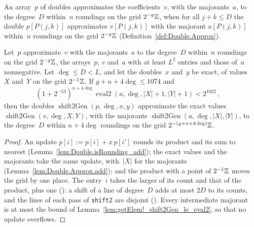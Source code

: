 \begin{definition}\label{def:Double.ApproxCoeffs}
  \leanok
  An array~$p$ of doubles approximates the coefficients~$v$, with the majorants~$a$, to the
  degree~$D$ within~$n$ roundings on the grid $2^{-g}\mathbb{Z}$, when for all $j + k \le D$ the double
  $p[P(j, k)]$ approximates $v[P(j, k)]$ with the majorant $a[P(j, k)]$ within~$n$ roundings on the
  grid $2^{-g}\mathbb{Z}$ (Definition~\ref{def:Double.Approx}).
\end{definition}

\begin{lemma}\label{lem:Double.ApproxCoeffs.shift2Gen}
  \leanok
  Let~$p$ approximate~$v$ with the majorants~$a$ to the degree~$D$ within~$n$ roundings on the grid
  $2^{-g}\mathbb{Z}$, the arrays~$p$, $v$ and~$a$ with at least $L^2$ entries and those of~$a$
  nonnegative. Let $\deg \le D < L$, and let the doubles~$x$ and~$y$ be exact, of values~$X$
  and~$Y$ on the grid $2^{-1}\mathbb{Z}$. If $g + n + 4\deg \le 1074$ and
  \[
    (1 + 2^{-53})^{n + 4\deg} \operatorname{eval2}(a, \deg, |X| + 1, |Y| + 1) < 2^{1022}\,,
  \]
  then the doubles $\operatorname{shift2Gen}(p, \deg, x, y)$ approximate the exact values
  $\operatorname{shift2Gen}(v, \deg, X, Y)$, with the majorants
  $\operatorname{shift2Gen}(a, \deg, |X|, |Y|)$, to the degree~$D$ within $n + 4\deg$ roundings on
  the grid $2^{-(g + n + 4\deg)}\mathbb{Z}$.
\end{lemma}

\begin{proof}
  \leanok
  An update $p[i] := p[i] + x\,p[i']$ rounds its product and its sum to nearest
  (Lemma~\ref{lem:Double.isRounding_add}); the exact values and the majorants take the same update,
  with~$|X|$ for the majorants (Lemma~\ref{lem:Double.Approx.add}); and the product with a point
  of $2^{-1}\mathbb{Z}$ moves the grid by one place. The entry~$i$ takes the larger of its count and that
  of the product, plus one (): a shift of a line of degree~$D$ adds at
  most $2D$ to its counts, and the lines of each pass of \texttt{shift2} are disjoint
  (). Every intermediate majorant is at most the
  bound of Lemma~\ref{lem:getElem!_shift2Gen_le_eval2}, so that no update overflows.
\end{proof}

